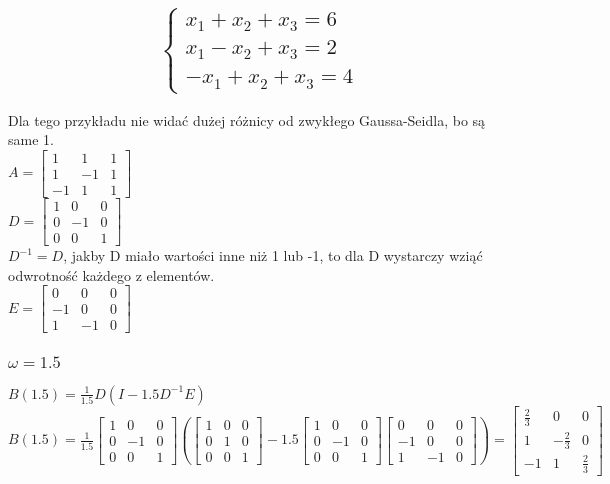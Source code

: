 \documentclass{article}
\begin{document}
\subsection{
\begin{equation*}\begin{cases}
    x_1+x_2+x_3=6\\
    x_1-x_2+x_3=2\\
    -x_1+x_2+x_3=4
\end{cases}\end{equation*}}
Dla tego przykładu nie widać dużej różnicy od zwykłego Gaussa-Seidla, bo są same 1.\\
$A=\begin{bmatrix} 1 & 1 & 1 \\ 1 & -1 & 1 \\ -1 & 1 & 1 \end{bmatrix}$\\
$D=\begin{bmatrix} 1 & 0 & 0 \\ 0 & -1 & 0 \\ 0 & 0 & 1 \end{bmatrix}$\\
$D^{-1}=D$, jakby D miało wartości inne niż 1 lub -1, to dla D wystarczy wziąć odwrotność każdego z elementów.\\
$E=\begin{bmatrix} 0 & 0 & 0 \\ -1 & 0 & 0 \\ 1 & -1 & 0 \end{bmatrix}$

\subsubsection{$\omega=1.5$}
$B(1.5)=\frac{1}{1.5}D(I-1.5D^{-1}E)$\\
$B(1.5)=\frac{1}{1.5}\begin{bmatrix} 1 & 0 & 0 \\ 0 & -1 & 0 \\ 0 & 0 & 1 \end{bmatrix}(\begin{bmatrix} 1 & 0 & 0 \\ 0 & 1 & 0 \\ 0 & 0 & 1 \end{bmatrix}-1.5\begin{bmatrix} 1 & 0 & 0 \\ 0 & -1 & 0 \\ 0 & 0 & 1 \end{bmatrix}\begin{bmatrix} 0 & 0 & 0 \\ -1 & 0 & 0 \\ 1 & -1 & 0 \end{bmatrix})=\begin{bmatrix} \frac{2}{3} & 0 & 0 \\ 1 & -\frac{2}{3} & 0 \\ -1 & 1 & \frac{2}{3} \end{bmatrix}$
\end{document}
